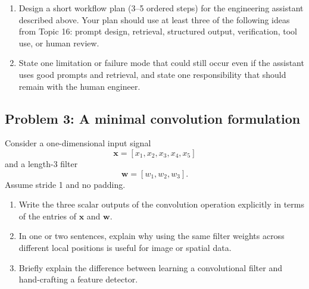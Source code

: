 \documentclass[12pt]{article}
\begin{document}
\begin{enumerate}
    \item Design a short workflow plan (3--5 ordered steps) for the engineering assistant described above. Your plan should use at least three of the following ideas from Topic 16: prompt design, retrieval, structured output, verification, tool use, or human review.

    \vspace{18pt}
    \fullunderline

    \vspace{18pt}
    \fullunderline

    \item State one limitation or failure mode that could still occur even if the assistant uses good prompts and retrieval, and state one responsibility that should remain with the human engineer.

    \vspace{18pt}
    \fullunderline

    \vspace{18pt}
    \fullunderline
\end{enumerate}

\newpage

\subsection*{Problem 3: A minimal convolution formulation}
Consider a one-dimensional input signal
\[
\bm{x} = [x_1,x_2,x_3,x_4,x_5]
\]
and a length-3 filter
\[
\bm{w} = [w_1,w_2,w_3].
\]
Assume stride 1 and no padding.

\begin{enumerate}
    \renewcommand{\labelenumi}{(\alph{enumi})}
    \item Write the three scalar outputs of the convolution operation explicitly in terms of the entries of \(\bm{x}\) and \(\bm{w}\).

    \vspace{18pt}
    \fullunderline

    \vspace{18pt}
    \fullunderline

    \item In one or two sentences, explain why using the same filter weights across different local positions is useful for image or spatial data.

    \vspace{18pt}
    \fullunderline

    \vspace{18pt}
    \fullunderline

    \item Briefly explain the difference between learning a convolutional filter and hand-crafting a feature detector.

    \vspace{18pt}
    \fullunderline

    \vspace{18pt}
    \fullunderline
\end{enumerate}
\end{document}
